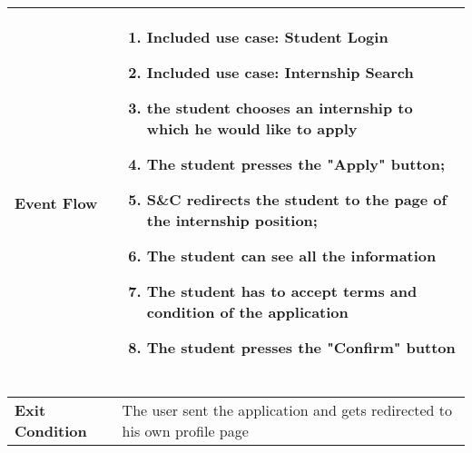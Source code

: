 \begin{enumerate}[label=\textbf{[US\arabic*]}, left = 0pt, align = left]
\begin{longtable}{|l|p{11cm}|}
                \textbf{Event Flow} &
                    \begin{enumerate}[label=\arabic*., itemsep=0.2em]
                        \item Included use case: Student Login
                        \item Included use case: Internship Search
                        \item the student chooses an internship to which he would like to apply
                        \item The student presses the "Apply" button;
                        \item S\&C redirects the student to the page of the internship position;
                        \item The student can see all the information
                        \item The student has to accept terms and condition of the application
                        \item The student presses the "Confirm" button
                        \
                    \end{enumerate} \\
                \hline
                
                \textbf{Exit Condition} & 
                    The user sent the application and gets redirected to his own profile page\\
                \hline
                

\end{longtable}
\end{enumerate}
